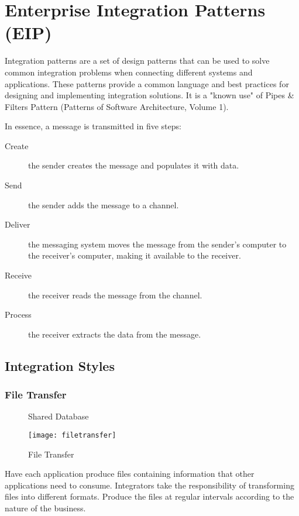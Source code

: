 \section{Enterprise Integration Patterns (EIP)}
Integration patterns are a set of design patterns that can be used to solve common integration problems when connecting different systems and applications. These patterns provide a common language and best practices for designing and implementing integration solutions. It is a "known use" of Pipes \& Filters Pattern (Patterns of Software Architecture, Volume 1).

In essence, a message is transmitted in five steps:
\begin{description}
  \item[Create] the sender creates the message and populates it with data.
  \item[Send] the sender adds the message to a channel.
  \item[Deliver] the messaging system moves the message from the sender’s computer to the receiver’s computer, making it available to the receiver.
  \item[Receive] the receiver reads the message from the channel.
  \item[Process ] the receiver extracts the data from the message.
\end{description}

\subsection{Integration Styles}
\subsubsection{File Transfer}
\begin{minipage}{.4\textwidth}
  \begin{figure}[H]
    \center
    \caption{Shared Database}
    \texttt{[image: filetransfer]}
    \caption{File Transfer}
  \end{figure}
\end{minipage}
\begin{minipage}[b]{.6\textwidth}
  Have each application produce files containing information that other applications need to consume. Integrators take the responsibility of transforming files into different formats. Produce the files at regular intervals according to the nature of the business.
\end{minipage}

